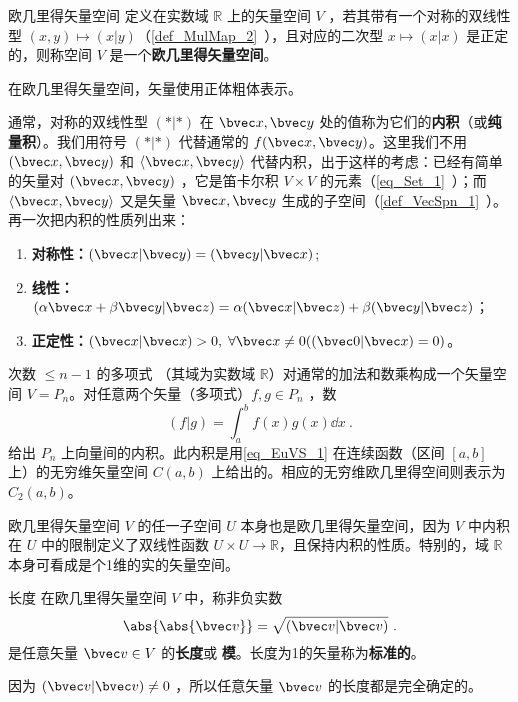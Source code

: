 

\begin{definition}{欧几里得矢量空间}\label{def_EuVS_1}
定义在实数域 $\mathbb R$ 上的矢量空间 $V$ ，若其带有一个对称的双线性型 $( x, y)\mapsto( x| y)$（\autoref{def_MulMap_2}~），且对应的二次型 $ x\mapsto( x| x)$ 是正定的，则称空间 $V$ 是一个\textbf{欧几里得矢量空间}。
\end{definition}

在欧几里得矢量空间，矢量使用正体粗体表示。

通常，对称的双线性型 $(*|*)$ 在 $\bvec x,\bvec y$ 处的值称为它们的\textbf{内积}（或\textbf{纯量积}）。我们用符号 $(*|*)$ 代替通常的 $f(\bvec x,\bvec y)$。这里我们不用 $(\bvec x,\bvec y)$ 和 $\langle\bvec x,\bvec y\rangle$ 代替内积，出于这样的考虑：已经有简单的矢量对 $(\bvec x,\bvec y)$ ，它是笛卡尔积 $V\times V$ 的元素（\autoref{eq_Set_1}~）；而 $\langle \bvec x,\bvec y\rangle $ 又是矢量 $\bvec x,\bvec y$ 生成的子空间（\autoref{def_VecSpn_1}~）。
再一次把内积的性质列出来：
\begin{enumerate}
\item \textbf{对称性：}$(\bvec x|\bvec y)=(\bvec y|\bvec x)$;
\item \textbf{线性：}$(\alpha\bvec x+\beta\bvec y|\bvec z)=\alpha(\bvec x|\bvec z)+\beta(\bvec y|\bvec z)$；
\item \textbf{正定性：}$(\bvec x|\bvec x)>0,\;\forall\bvec x\neq0((\bvec 0|\bvec x)=0)$。
\end{enumerate}
\begin{example}{}\label{ex_EuVS_1}
次数 $\leq n-1$ 的多项式 （其域为实数域 $\mathbb R$）对通常的加法和数乘构成一个矢量空间 $V=P_n$。对任意两个矢量（多项式）$f,g\in P_n$ ，数 
\begin{equation}\label{eq_EuVS_1}
(f|g)=\int_a^b f(x)g(x)\dd x~.
\end{equation}
给出 $P_n$ 上向量间的内积。此内积是用\autoref{eq_EuVS_1} 在连续函数（区间 $[a,b]$ 上）的无穷维矢量空间 $C(a,b)$ 上给出的。相应的无穷维欧几里得空间则表示为 $C_2(a,b)$。
\end{example}
\begin{example}{}
欧几里得矢量空间 $V$ 的任一子空间 $U$ 本身也是欧几里得矢量空间，因为 $V$ 中内积在 $U$ 中的限制定义了双线性函数 $U\times U\rightarrow\mathbb R$，且保持内积的性质。特别的，域 $\mathbb R$ 本身可看成是个1维的实的矢量空间。
\end{example}
\begin{definition}{长度}\label{def_EuVS_2}
在欧几里得矢量空间 $V$ 中，称非负实数
\begin{equation}
\abs{\abs{\bvec v}}=\sqrt{(\bvec v|\bvec v)}~.
\end{equation}
是任意矢量 $\bvec v\in V$ 的\textbf{长度}或 \textbf{模}。长度为1的矢量称为\textbf{标准的}。
\end{definition}
因为 $(\bvec v|\bvec v)\neq0$ ，所以任意矢量 $\bvec v$ 的长度都是完全确定的。


